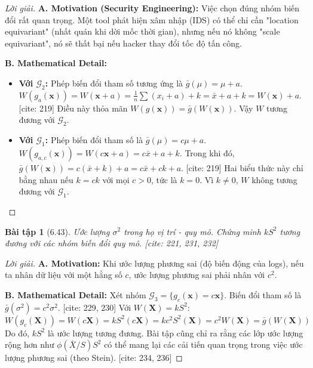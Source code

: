 \documentclass[8pt,a4paper]{article}
\newtheorem{exercise}{Bài tập}
\newenvironment{solution}{\begin{proof}[Lời giải]}{\end{proof}}
\begin{document}
\begin{solution}
\textbf{A. Motivation (Security Engineering):} Việc chọn đúng nhóm biến đổi rất quan trọng. Một tool phát hiện xâm nhập (IDS) có thể chỉ cần "location equivariant" (nhất quán khi dời mốc thời gian), nhưng nếu nó không "scale equivariant", nó sẽ thất bại nếu hacker thay đổi tốc độ tấn công.

\textbf{B. Mathematical Detail:}
\begin{itemize}
    \item \textbf{Với $\mathcal{G}_2$:} Phép biến đổi tham số tương ứng là $\bar{g}(\mu) = \mu + a$. 
    $W(g_a(\mathbf{x})) = W(\mathbf{x}+a) = \frac{1}{n}\sum(x_i+a) + k = \bar{x} + a + k = W(\mathbf{x}) + a$. [cite: 219]
    Điều này thỏa mãn $W(g(\mathbf{x})) = \bar{g}(W(\mathbf{x}))$. Vậy $W$ tương đương với $\mathcal{G}_2$.
    \item \textbf{Với $\mathcal{G}_1$:} Phép biến đổi tham số là $\bar{g}(\mu) = c\mu + a$.
    $W(g_{a,c}(\mathbf{x})) = W(c\mathbf{x}+a) = c\bar{x} + a + k$.
    Trong khi đó, $\bar{g}(W(\mathbf{x})) = c(\bar{x} + k) + a = c\bar{x} + ck + a$. [cite: 219]
    Hai biểu thức này chỉ bằng nhau nếu $k = ck$ với mọi $c > 0$, tức là $k=0$. Vì $k \neq 0$, $W$ không tương đương với $\mathcal{G}_1$.
\end{itemize}
\end{solution}

\begin{exercise}[6.43]
Ước lượng $\sigma^2$ trong họ vị trí - quy mô. Chứng minh $kS^2$ tương đương với các nhóm biến đổi quy mô. [cite: 221, 231, 232]
\end{exercise}

\begin{solution}
\textbf{A. Motivation:} Khi ước lượng phương sai (độ biến động của logs), nếu ta nhân dữ liệu với một hằng số $c$, ước lượng phương sai phải nhân với $c^2$.

\textbf{B. Mathematical Detail:}
Xét nhóm $\mathcal{G}_3 = \{g_c(\mathbf{x}) = c\mathbf{x}\}$. Biến đổi tham số là $\bar{g}(\sigma^2) = c^2\sigma^2$. [cite: 229, 230]
Với $W(\mathbf{X}) = kS^2$:
\[ W(g_c(\mathbf{X})) = W(c\mathbf{X}) = k S^2(c\mathbf{X}) = k c^2 S^2(\mathbf{X}) = c^2 W(\mathbf{X}) = \bar{g}(W(\mathbf{X})) \]
Do đó, $kS^2$ là ước lượng tương đương. Bài tập cũng chỉ ra rằng các lớp ước lượng rộng hơn như $\phi(\bar{X}/S)S^2$ có thể mang lại các cải tiến quan trọng trong việc ước lượng phương sai (theo Stein). [cite: 234, 236]
\end{solution}
\end{document}
